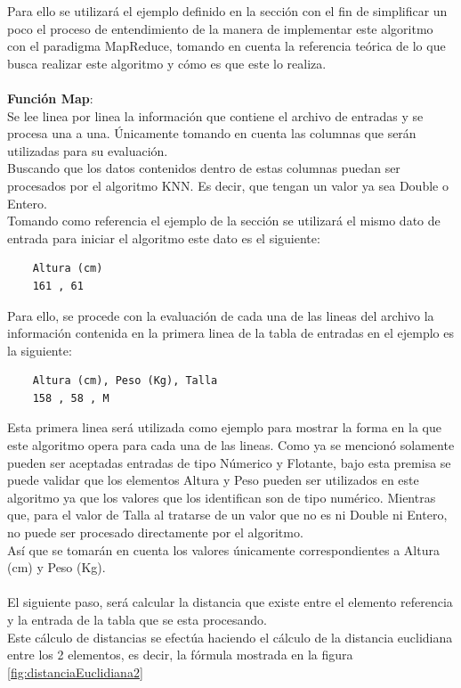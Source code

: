 Para ello se utilizará el ejemplo definido en la sección  con el fin de simplificar un poco el proceso de entendimiento de la manera de implementar este algoritmo con el paradigma MapReduce, tomando en cuenta la referencia teórica de lo que busca realizar este algoritmo y cómo es que este lo realiza.\\
\\
\textbf{Función Map}: 
\\
Se lee linea por linea la información que contiene el archivo de entradas y se procesa una a una. Únicamente tomando en cuenta las columnas que serán utilizadas para su evaluación.\\
Buscando que los datos contenidos dentro de estas columnas puedan ser procesados por el algoritmo KNN. Es decir, que tengan un valor ya sea Double o Entero. \\ 
Tomando como referencia el ejemplo de la sección  se utilizará el mismo dato de entrada para iniciar el algoritmo este dato es el siguiente:
\begin{lstlisting} 
	Altura (cm)
	161 , 61 
\end{lstlisting}
Para ello, se procede con la evaluación de cada una de las lineas del archivo la información contenida en la primera linea de la tabla de entradas en el ejemplo es la siguiente:\\ 
\begin{lstlisting} 
	Altura (cm), Peso (Kg), Talla
	158 , 58 , M
\end{lstlisting} 
Esta primera linea será utilizada como ejemplo para mostrar la forma en la que este algoritmo opera para cada una de las lineas. Como ya se mencionó solamente pueden ser aceptadas entradas de tipo Númerico y Flotante, bajo esta premisa se puede validar que los elementos Altura y Peso pueden ser utilizados en este algoritmo ya que los valores que los identifican son de tipo numérico. Mientras que, para el valor de Talla al tratarse de un valor que no es ni Double ni Entero, no puede ser procesado directamente por el algoritmo. 
\\
Así que se tomarán en cuenta los valores únicamente correspondientes a Altura (cm) y Peso (Kg).\\
\\
El siguiente paso, será calcular la distancia que existe entre el elemento referencia y la entrada de la tabla que se esta procesando. \\
Este cálculo de distancias se efectúa haciendo el cálculo de la distancia euclidiana entre los 2 elementos, es decir, la fórmula mostrada en la figura \ref{fig:distanciaEuclidiana2}\\
